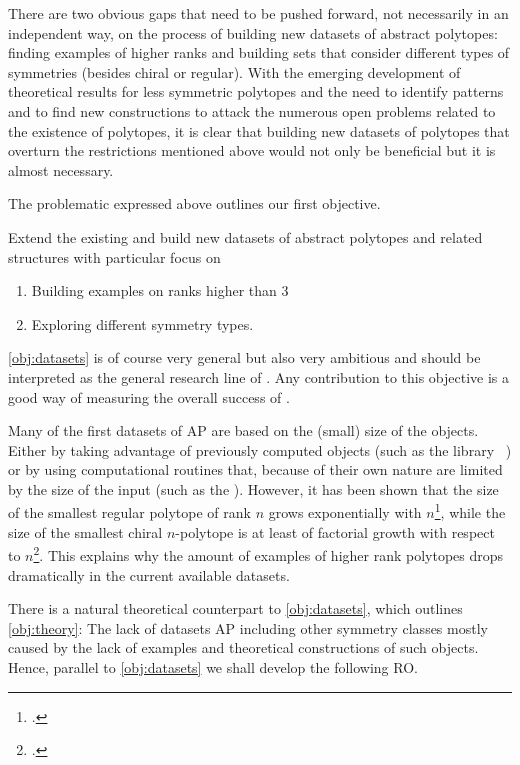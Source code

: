 There are two obvious gaps that need to be pushed forward, not necessarily in an independent way, on the process of building new datasets of abstract polytopes: finding examples of higher ranks and building sets that consider different types of symmetries (besides chiral or regular).
With the emerging development of theoretical results for less symmetric polytopes and the need to identify patterns and to find new constructions to attack the numerous open problems related to the existence of polytopes, it is clear that building new datasets of polytopes that overturn the restrictions mentioned above would not only be beneficial but it is almost necessary.

The problematic expressed above outlines our first objective.

\begin{obj}\label{obj:datasets}
  Extend the existing and build new datasets of abstract polytopes and related structures with particular focus on
  \begin{enumerate}[label=\textit{(\roman*)}, noitemsep]
    \item Building examples on ranks higher than $3$
    \item Exploring different symmetry types.
  \end{enumerate}
\end{obj}

\cref{obj:datasets} is of course very general but also very ambitious and should be interpreted as the general research line of \ourp.
Any contribution to this objective is a good way of measuring the overall success of \ourp.

Many of the first datasets of AP are based on the (small) size of the objects.
Either by taking advantage of previously computed objects (such as the library \smallgrp\ ) or by using computational routines that, because of their own nature are limited by the size of the input (such as the \lins).
However, it has been shown that the size of the smallest regular polytope of rank $n$ grows exponentially with $n$\footcite{Conder_2013_SmallestRegularPolytopes}, while the size of the smallest chiral $n$-polytope is at least of factorial growth with respect to $n$\footcite{Cunningham_2017_NonFlatRegular}.
This explains why the amount of examples of higher rank polytopes drops dramatically in the current available datasets.

There is a natural theoretical counterpart to \cref{obj:datasets}, which outlines \cref{obj:theory}:
The lack of datasets AP including other symmetry classes mostly caused by the lack of examples and theoretical constructions of such objects.
Hence, parallel to \cref{obj:datasets} we shall develop the following RO.


